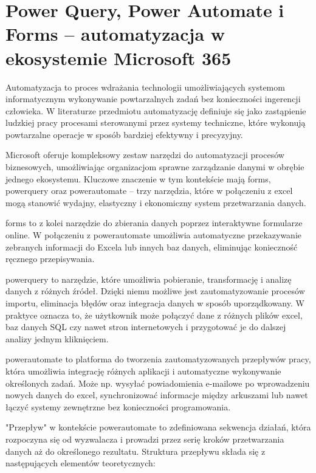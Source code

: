 \section{Power Query, Power Automate i Forms – automatyzacja w ekosystemie Microsoft 365}

Automatyzacja to proces wdrażania technologii umożliwiających systemom informatycznym wykonywanie powtarzalnych zadań bez konieczności ingerencji człowieka. W literaturze przedmiotu automatyzację definiuje się jako zastąpienie ludzkiej pracy procesami sterowanymi przez systemy techniczne, które wykonują powtarzalne operacje w sposób bardziej efektywny i precyzyjny.~\cite{brzezinski2002}

Microsoft oferuje kompleksowy zestaw narzędzi do automatyzacji procesów biznesowych, umożliwiając organizacjom sprawne zarządzanie danymi w obrębie jednego ekosystemu. Kluczowe znaczenie w tym kontekście mają \gls{forms}, \gls{powerquery} oraz \gls{powerautomate} – trzy narzędzia, które w połączeniu z \gls{excel} mogą stanowić wydajny, elastyczny i ekonomiczny system przetwarzania danych.

\gls{forms} to z kolei narzędzie do zbierania danych poprzez interaktywne formularze online. W połączeniu z \gls{powerautomate} umożliwia automatyczne przekazywanie zebranych informacji do Excela lub innych baz danych, eliminując konieczność ręcznego przepisywania.

\gls{powerquery} to narzędzie, które umożliwia pobieranie, transformację i analizę danych z różnych źródeł. Dzięki niemu możliwe jest zautomatyzowanie procesów importu, eliminacja błędów oraz integracja danych w sposób uporządkowany. W praktyce oznacza to, że użytkownik może połączyć dane z różnych plików \gls{excel}, baz danych SQL czy nawet stron internetowych i przygotować je do dalszej analizy jednym kliknięciem.

\gls{powerautomate} to platforma do tworzenia zautomatyzowanych przepływów pracy, która umożliwia integrację różnych aplikacji i automatyczne wykonywanie określonych zadań. Może np. wysyłać powiadomienia e-mailowe po wprowadzeniu nowych danych do \gls{excel}, synchronizować informacje między arkuszami lub nawet łączyć systemy zewnętrzne bez konieczności programowania.

"Przepływ" w kontekście \gls{powerautomate} to zdefiniowana sekwencja działań, która rozpoczyna się od wyzwalacza i prowadzi przez serię kroków przetwarzania danych aż do określonego rezultatu. \cite{microsoft_power_automate_2025} Struktura przepływu składa się z następujących elementów teoretycznych:

